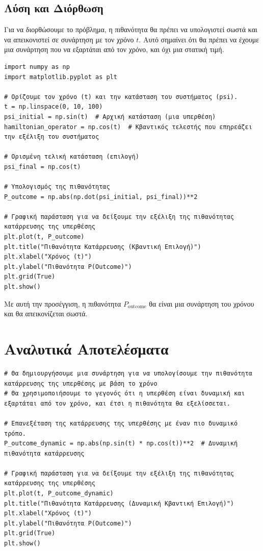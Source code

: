 \documentclass[a4paper,11pt]{article}
\begin{document}
\subsection*{Λύση και Διόρθωση}

Για να διορθώσουμε το πρόβλημα, η πιθανότητα θα πρέπει να υπολογιστεί σωστά και να απεικονιστεί σε συνάρτηση με τον χρόνο \( t \). Αυτό σημαίνει ότι θα πρέπει να έχουμε μια συνάρτηση που να εξαρτάται από τον χρόνο, και όχι μια στατική τιμή.

\begin{verbatim}
import numpy as np
import matplotlib.pyplot as plt

# Ορίζουμε τον χρόνο (t) και την κατάσταση του συστήματος (psi).
t = np.linspace(0, 10, 100)
psi_initial = np.sin(t)  # Αρχική κατάσταση (μια υπερθέση)
hamiltonian_operator = np.cos(t)  # Κβαντικός τελεστής που επηρεάζει την εξέλιξη του συστήματος

# Ορισμένη τελική κατάσταση (επιλογή)
psi_final = np.cos(t)

# Υπολογισμός της πιθανότητας
P_outcome = np.abs(np.dot(psi_initial, psi_final))**2

# Γραφική παράσταση για να δείξουμε την εξέλιξη της πιθανότητας κατάρρευσης της υπερθέσης
plt.plot(t, P_outcome)
plt.title("Πιθανότητα Κατάρρευσης (Κβαντική Επιλογή)")
plt.xlabel("Χρόνος (t)")
plt.ylabel("Πιθανότητα P(Outcome)")
plt.grid(True)
plt.show()
\end{verbatim}

Με αυτή την προσέγγιση, η πιθανότητα \( P_{\text{outcome}} \) θα είναι μια συνάρτηση του χρόνου και θα απεικονίζεται σωστά.

\section*{Αναλυτικά Αποτελέσματα}

\begin{verbatim}
# Θα δημιουργήσουμε μια συνάρτηση για να υπολογίσουμε την πιθανότητα κατάρρευσης της υπερθέσης με βάση το χρόνο
# Θα χρησιμοποιήσουμε το γεγονός ότι η υπερθέση είναι δυναμική και εξαρτάται από τον χρόνο, και έτσι η πιθανότητα θα εξελίσσεται.

# Επανεξέταση της κατάρρευσης της υπερθέσης με έναν πιο δυναμικό τρόπο.
P_outcome_dynamic = np.abs(np.sin(t) * np.cos(t))**2  # Δυναμική πιθανότητα κατάρρευσης

# Γραφική παράσταση για να δείξουμε την εξέλιξη της πιθανότητας κατάρρευσης της υπερθέσης
plt.plot(t, P_outcome_dynamic)
plt.title("Πιθανότητα Κατάρρευσης (Δυναμική Κβαντική Επιλογή)")
plt.xlabel("Χρόνος (t)")
plt.ylabel("Πιθανότητα P(Outcome)")
plt.grid(True)
plt.show()
\end{verbatim}
\end{document}
